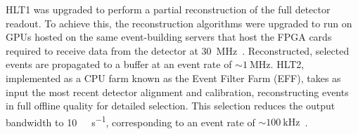 HLT1 was upgraded to perform a partial reconstruction of the full detector readout. To achieve this, the reconstruction algorithms were upgraded to run on GPUs hosted on the same event-building servers that host the FPGA cards required to receive data from the detector at \SI{30}{\mega\hertz}~\cite{LHCb_Allen_GPU}. Reconstructed, selected events are propagated to a buffer at an event rate of ${\sim}\SI{1}{\mega\hertz}$. HLT2, implemented as a CPU farm known as the Event Filter Farm (EFF), takes as input the most recent detector alignment and calibration, reconstructing events in full offline quality for detailed selection. This selection reduces the output bandwidth to \SI{10}{\giga\byte\per\second}, corresponding to an event rate of $\sim\SI{100}{\kilo\hertz}$~\cite{lhcb_hlt2_storage_run3}.
